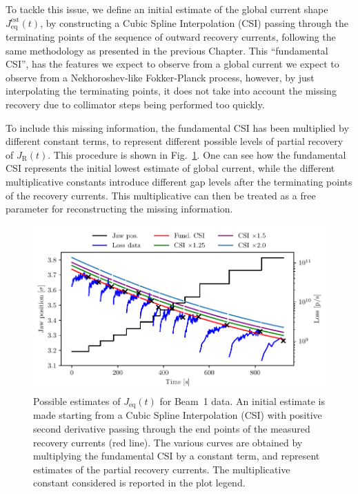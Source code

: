 To tackle this issue, we define an initial estimate of the global current shape $J_\text{eq}^{\text{est}}(t)$, by constructing a Cubic Spline Interpolation (CSI) passing through the terminating points of the sequence of outward recovery currents, following the same methodology as presented in the previous Chapter. This ``fundamental CSI'', has the features we expect to observe from a global current we expect to observe from a Nekhoroshev-like Fokker-Planck process, however, by just interpolating the terminating points, it does not take into account the missing recovery due to collimator steps being performed too quickly.

To include this missing information, the fundamental CSI has been multiplied by different constant terms, to represent different possible levels of partial recovery of $J_\mathrm{R}(t)$. This procedure is shown in Fig.~\ref{fig:second}. One can see how the fundamental CSI represents the initial lowest estimate of global current, while the different multiplicative constants introduce different gap levels after the terminating points of the recovery currents. This multiplicative can then be treated as a free parameter for reconstructing the missing information.

%
\begin{figure}
    \centering
    \includegraphics[trim={0 2.5mm 0 3mm}, clip, width=\columnwidth]{5_Diffusion_measurement_LHC/figs/second_bis.pdf}
    \caption{Possible estimates of $J_\mathrm{eq}(t)$ for Beam~1 data. An initial estimate is made starting from a Cubic Spline Interpolation (CSI) with positive second derivative passing through the end points of the measured recovery currents (red line). The various curves are obtained by multiplying the fundamental CSI by a constant term, and represent estimates of the partial recovery currents. The multiplicative constant considered is reported in the plot legend.}
    \label{fig:second}
\end{figure}
%

